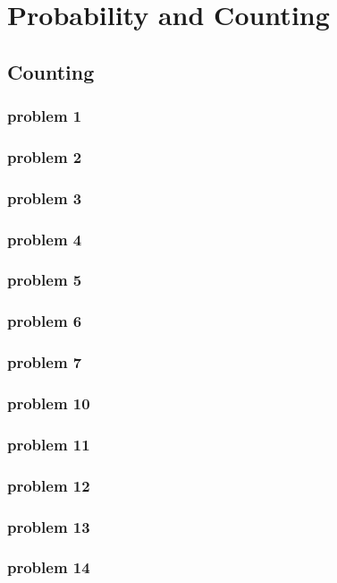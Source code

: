 \chapter{Probability and Counting}
\label{ch:pac}
\ifdefined\HCode
\else
{
\startcontents[chapter]
}
\fi
  \section{Counting}
  
  \subsection{problem 1}
  

  \subsection{problem 2}
  

  \subsection{problem 3}
  

  \subsection{problem 4}
  

  \subsection{problem 5}
  

  \subsection{problem 6}
  

  \subsection{problem 7}
  

  \subsection{problem 10}
  

  \subsection{problem 11}
  

  \subsection{problem 12}
  

  \subsection{problem 13}
  

  \subsection{problem 14}
  

\ifdefined\HCode
{}
\fi

\ifdefined\HCode
\else
{
\stopcontents[chapter]
}
\fi